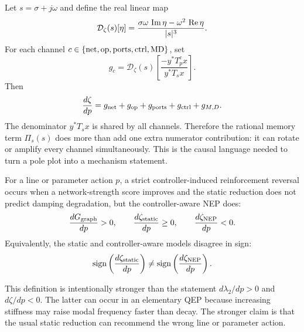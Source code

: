 Let \(s=\sigma+j\omega\) and define the real linear map
\begin{equation}
  \mathcal D_\zeta(s)[\eta]
  =
  \frac{\sigma\omega\,\operatorname{Im} \eta-\omega^2\,\operatorname{Re} \eta}{|s|^3}.
  \label{eq:zeta_linear_map}
\end{equation}
For each channel \(c\in\{\rm net,op,ports,ctrl,MD\}\), set
\begin{equation}
  g_c
  =
  \mathcal D_\zeta(s)
  \left[
  \frac{-y^*T_p^c x}{y^*T_sx}
  \right].
  \label{eq:channel_zeta_gain}
\end{equation}
Then
\begin{equation}
  \frac{d\zeta}{dp}
  =
  g_{\rm net}
  +g_{\rm op}
  +g_{\rm ports}
  +g_{\rm ctrl}
  +g_{M,D}.
  \label{eq:zeta_channel_decomposition}
\end{equation}
The denominator \(y^*T_sx\) is shared by all channels. Therefore the rational
memory term \(\Pi_s(s)\) does more than add one extra numerator contribution:
it can rotate or amplify every channel simultaneously. This is the causal
language needed to turn a pole plot into a mechanism statement.

\begin{definition}
For a line or parameter action \(p\), a strict controller-induced reinforcement
reversal occurs when a network-strength score improves and the static
reduction does not predict damping degradation, but the controller-aware NEP
does:
\begin{equation}
  \frac{dG_{\rm graph}}{dp}>0,
  \qquad
  \frac{d\zeta_{\rm static}}{dp}\ge0,
  \qquad
  \frac{d\zeta_{\rm NEP}}{dp}<0.
  \label{eq:strict_controller_reversal}
\end{equation}
Equivalently, the static and controller-aware models disagree in sign:
\begin{equation}
  \operatorname{sign}
  \left(\frac{d\zeta_{\rm static}}{dp}\right)
  \ne
  \operatorname{sign}
  \left(\frac{d\zeta_{\rm NEP}}{dp}\right).
  \label{eq:static_nep_sign_mismatch}
\end{equation}
\end{definition}

This definition is intentionally stronger than the statement
\(d\lambda_2/dp>0\) and \(d\zeta/dp<0\). The latter can occur in an elementary
QEP because increasing stiffness may raise modal frequency faster than decay.
The stronger claim is that the usual static reduction can recommend the wrong
line or parameter action.

